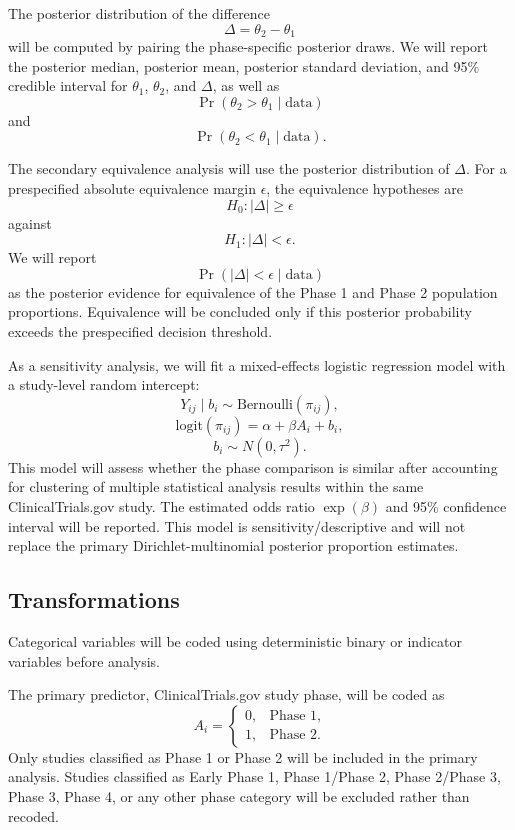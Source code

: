 \documentclass[11pt]{article}
\begin{document}
The posterior distribution of the difference
\[
\Delta = \theta_2 - \theta_1
\]
will be computed by pairing the phase-specific posterior draws. We will report the posterior median, posterior mean, posterior standard deviation, and 95\% credible interval for \(\theta_1\), \(\theta_2\), and \(\Delta\), as well as
\[
\Pr(\theta_2 > \theta_1 \mid \text{data})
\]
and
\[
\Pr(\theta_2 < \theta_1 \mid \text{data}).
\]

The secondary equivalence analysis will use the posterior distribution of \(\Delta\). For a prespecified absolute equivalence margin \(\epsilon\), the equivalence hypotheses are
\[
H_0: |\Delta| \geq \epsilon
\]
against
\[
H_1: |\Delta| < \epsilon.
\]
We will report
\[
\Pr(|\Delta| < \epsilon \mid \text{data})
\]
as the posterior evidence for equivalence of the Phase 1 and Phase 2 population proportions. Equivalence will be concluded only if this posterior probability exceeds the prespecified decision threshold.

As a sensitivity analysis, we will fit a mixed-effects logistic regression model with a study-level random intercept:
\[
Y_{ij} \mid b_i \sim \mathrm{Bernoulli}(\pi_{ij}),
\]
\[
\mathrm{logit}(\pi_{ij}) = \alpha + \beta A_i + b_i,
\]
\[
b_i \sim N(0,\tau^2).
\]
This model will assess whether the phase comparison is similar after accounting for clustering of multiple statistical analysis results within the same ClinicalTrials.gov study. The estimated odds ratio \(\exp(\beta)\) and 95\% confidence interval will be reported. This model is sensitivity/descriptive and will not replace the primary Dirichlet-multinomial posterior proportion estimates.

\subsection{Transformations}

Categorical variables will be coded using deterministic binary or indicator variables before analysis.

The primary predictor, ClinicalTrials.gov study phase, will be coded as
\[
A_i =
\begin{cases}
0, & \text{Phase 1},\\
1, & \text{Phase 2}.
\end{cases}
\]
Only studies classified as Phase 1 or Phase 2 will be included in the primary analysis. Studies classified as Early Phase 1, Phase 1/Phase 2, Phase 2/Phase 3, Phase 3, Phase 4, or any other phase category will be excluded rather than recoded.
\end{document}
